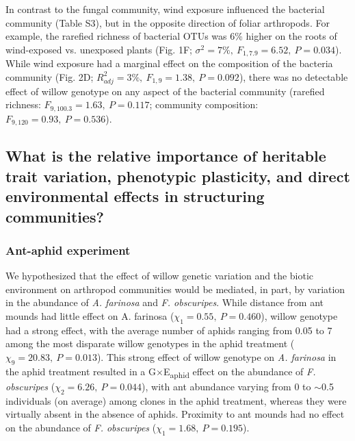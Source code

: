 \documentclass[11pt]{article}
\begin{document}
In contrast to the fungal community, wind exposure influenced the
bacterial community (Table S3), but in the opposite direction of foliar
arthropods. For example, the rarefied richness of bacterial OTUs was 6\%
higher on the roots of wind-exposed vs. unexposed plants (Fig. 1F;
\(\sigma^2=7\%,\ F_{1,7.9}=6.52,\ P=0.034\)). While wind exposure had a marginal effect on the
composition of the bacteria community (Fig. 2D; \(R_{adj}^2=3\%,\ F_{1,9}=1.38,\ P=0.092\)),
there was no detectable effect of willow genotype on any aspect of the
bacterial community (rarefied richness: \(F_{9,100.3}=1.63,\ P=0.117\); community
composition: \(F_{9,120}=0.93,\ P=0.536\)).

\subsection*{What is the relative importance of heritable trait
variation, phenotypic plasticity, and direct environmental effects in
structuring
communities?}

\subsubsection*{Ant-aphid experiment}

We hypothesized that the effect of willow genetic variation and the
biotic environment on arthropod communities would be mediated, in part,
by variation in the abundance of \textit{A. farinosa} and \textit{F.
obscuripes}. While distance from ant mounds had little effect on A.
farinosa (\(\chi_1=0.55,\ P=0.460\)), willow genotype had a strong effect, with
the average number of aphids ranging from 0.05 to 7 among the most
disparate willow genotypes in the aphid treatment (\(\chi_9=20.83,\ P=0.013\)).
This strong effect of willow genotype on \textit{A. farinosa} in the aphid
treatment resulted in a G$\times$E\textsubscript{aphid} effect on the abundance
of \textit{F. obscuripes} ($\chi_2=6.26, \ P=0.044$), with ant abundance varying
from 0 to $\sim$0.5 individuals (on average) among clones in
the aphid treatment, whereas they were virtually absent in the absence
of aphids. Proximity to ant mounds had no effect on the abundance of
\textit{F. obscuripes} (\(\chi_1=1.68,\ P=0.195\)).
\end{document}
